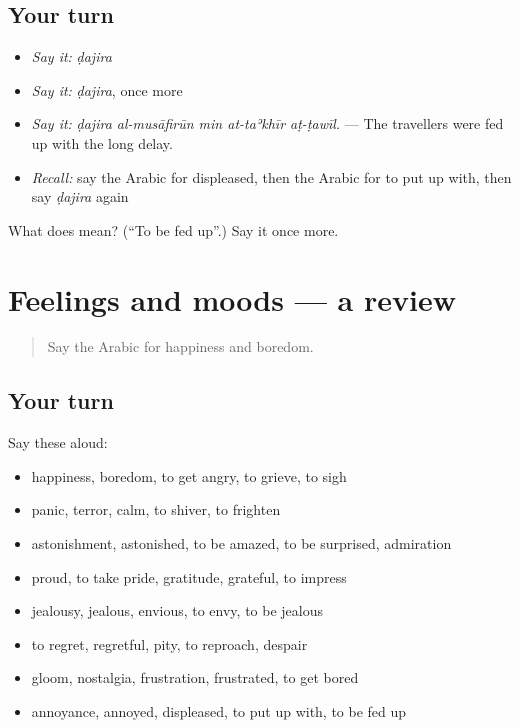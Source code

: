 \subsection*{Your turn}
\begin{itemize}
\raggedright
  \item \emph{Say it:} \emph{ḍajira}
  \item \emph{Say it:} \emph{ḍajira}, once more
  \item \emph{Say it:} \emph{ḍajira al-musāfirūn min at-taʾkhīr aṭ-ṭawīl.} — The travellers were fed up with the long delay.
  \item \emph{Recall:} say the Arabic for displeased, then the Arabic for to put up with, then say \emph{ḍajira} again
\end{itemize}

\begin{tcolorbox}[breakable,colback=teal!4,colframe=teal!35!black,title={Before you move on}]
What does  mean? (\textquotedblleft{}To be fed up\textquotedblright{}.) Say it once more.
\end{tcolorbox}
\section[(dialogue)]{Feelings and moods — a review}

\label{lesson:AR-R495-review-488-495}



\begin{quote}
Say the Arabic for happiness and boredom.
\end{quote}

\subsection*{Your turn}
Say these aloud:

\begin{itemize}
\raggedright
  \item happiness, boredom, to get angry, to grieve, to sigh
  \item panic, terror, calm, to shiver, to frighten
  \item astonishment, astonished, to be amazed, to be surprised, admiration
  \item proud, to take pride, gratitude, grateful, to impress
  \item jealousy, jealous, envious, to envy, to be jealous
  \item to regret, regretful, pity, to reproach, despair
  \item gloom, nostalgia, frustration, frustrated, to get bored
  \item annoyance, annoyed, displeased, to put up with, to be fed up
\end{itemize}

